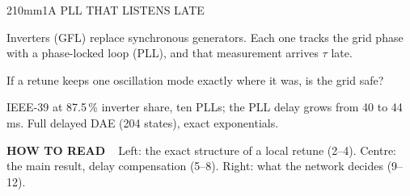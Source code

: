\begin{DensePanel}{210mm}{1}{A PLL THAT LISTENS LATE}
  {\DenseBody Inverters (GFL) replace synchronous generators. Each one tracks the grid phase with a phase-locked loop (PLL), and that measurement arrives $\tau$ late.\par}
  \vspace{2mm}
  \begin{center}
  \end{center}
  \vspace{2mm}
  {\fontsize{33pt}{38pt}\selectfont\bfseries\raggedright\color{IASDarkGreen} If a retune keeps one oscillation mode exactly where it was, is the grid safe?\par}
  \vspace{2mm}
  {\DenseBody IEEE-39 at 87.5\,\% inverter share, ten PLLs; the PLL delay grows from 40 to 44 ms. Full delayed DAE (204 states), exact exponentials.\par}
  \vspace{3mm}
  \begin{DenseWords}\textbf{\color{IASGold!65!black}HOW TO READ\ \ }Left: the exact structure of a local retune (2--4). Centre: the main result, delay compensation (5--8). Right: what the network decides (9--12).\end{DenseWords}
\end{DensePanel}
